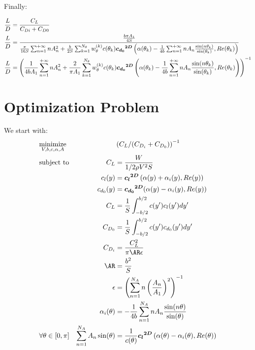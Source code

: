 \documentclass[letterpaper,12pt]{article}
\begin{document}
Finally:

\begin{align}
	\label{eq:ld}
	\frac L D &= \frac {C_L} 
	{C_{Di} + C_{D0}} \nonumber \\
	\frac L D &= \frac{\frac{b \pi A_1}{4S}}{
		\frac {\pi}{16S} \sum_{n=1}^{+\infty} n A_{n}^2 + 
		\frac b {2S} \sum_{k=1}^{N_{\theta}} w_{\theta}^{(k)} c(\theta_k) \boldsymbol{{c_{d_0}}^{2D}}\left( \alpha(\theta_k) - \frac {1}{4b} \sum_{n=1}^{+\infty} n A_n \frac{ \sin(n\theta_k) }{\sin(\theta_k)} , Re(\theta_k)\right)
	} \nonumber \\
	\frac L D &= \left(	\frac {1}{4bA_1} \sum_{n=1}^{+\infty} n A_{n}^2 + 
		\frac {2} {\pi A_1} \sum_{k=1}^{N_{\theta}} w_{\theta}^{(k)} c(\theta_k) \boldsymbol{{c_{d_0}}^{2D}}\left( \alpha(\theta_k) - \frac {1}{4b} \sum_{n=1}^{+\infty} n A_n \frac{ \sin(n\theta_k) }{\sin(\theta_k)} , Re(\theta_k)\right) 
	\right)^{-1} 
\end{align}


\section{Optimization Problem}

We start with:
\begin{align*}
	& \underset{V, b, c, \alpha, A}{\text{minimize}}
	& & \left( C_L / (C_{D_i} + C_{D_0})\right)^{-1} \nonumber \\
	& \text{subject to} 
	& C_L &= \frac{W}{1/2 \rho V^2 S} \\
	& & c_l(y) &= \cl \left( \alpha(y) + \alpha_i(y), Re(y)\right) \\
	& & c_{d_0}(y) &= \cd(\alpha(y) - \alpha_i(y), Re(y)) \\
	& & C_L &= \frac 1 S \int_{-b/2}^{b/2} c(y') c_l(y') dy'\\
	& & C_{D_0} &= \frac 1 S \int_{-b/2}^{b/2} c(y') c_{d_0}(y') dy'\\
	& & C_{D_i} & = \frac{C_L^2}{\pi \AR \epsilon} \\
	& & \AR &= \frac{b^2}{S} \\
	& & \epsilon &= \left(\sum_{n=1}^{N_A} n \left(\frac{A_n}{A_1}\right)^2 \right)^{-1} \\
	& & \alpha_i(\theta) &= -\frac 1 {4b} \sum_{n=1}^{N_A} n A_n\frac{\sin(n\theta)}{\sin(\theta)} \\
	& \forall \theta \in [0, \pi] & \sum_{n=1}^{N_A} A_n \sin(\theta) &= \frac{1}{c(\theta)} \cl \left( \alpha(\theta) - \alpha_i(\theta), Re(\theta)\right) \\
\end{align*}
\end{document}
